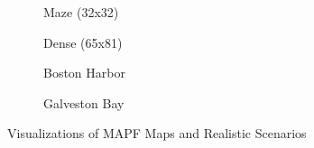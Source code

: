 \documentclass[letterpaper, 10 pt, conference]{IEEEConference}
\begin{document}
\begin{figure}
    \centering
    \captionsetup[subfigure]{justification=centering}
     \begin{subfigure}[b]{0.1\textwidth}
         
         \caption{Maze (32x32)}
     \end{subfigure}
     \hfill
     \begin{subfigure}[b]{0.1\textwidth}
         \centering
         
         \caption{Dense (65x81)}
     \end{subfigure}
     \hfill
     \begin{subfigure}[b]{0.115\textwidth}
         \centering
         
         \caption{Boston Harbor}
     \end{subfigure}
    \begin{subfigure}[b]{0.115\textwidth}
         \centering
         
         \caption{Galveston Bay}
     \end{subfigure} 
     \caption{Visualizations of MAPF Maps and Realistic Scenarios}
    \label{fig:maps}
\end{figure}

\end{document}
